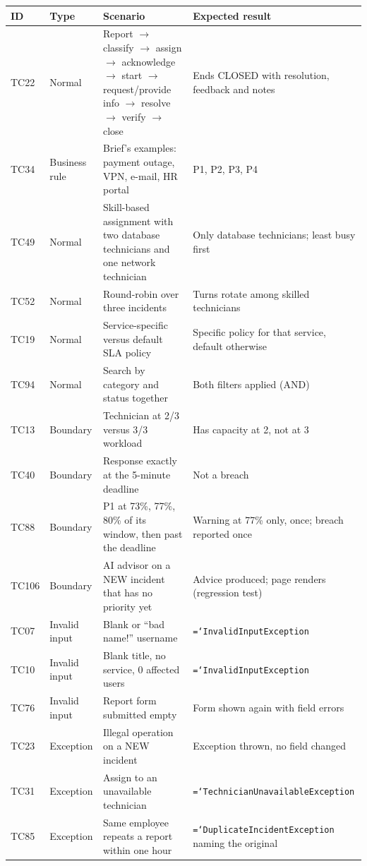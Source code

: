 \documentclass[11pt,a4paper]{article}
\newcommand{\code}[1]{\texttt{\hyphenchar\font=`\-\relax #1}}
\begin{document}
\begin{longtable}{@{}L{1.1cm}L{2.2cm}L{5.8cm}L{5.8cm}@{}}
\toprule
\textbf{ID} & \textbf{Type} & \textbf{Scenario} & \textbf{Expected result} \\
\midrule\endhead
TC22 & Normal & Report $\rightarrow$ classify $\rightarrow$ assign $\rightarrow$ acknowledge $\rightarrow$ start $\rightarrow$ request/provide info $\rightarrow$ resolve $\rightarrow$ verify $\rightarrow$ close & Ends CLOSED with resolution, feedback and notes \\
TC34 & Business rule & Brief's examples: payment outage, VPN, e-mail, HR portal & P1, P2, P3, P4 \\
TC49 & Normal & Skill-based assignment with two database technicians and one network technician & Only database technicians; least busy first \\
TC52 & Normal & Round-robin over three incidents & Turns rotate among skilled technicians \\
TC19 & Normal & Service-specific versus default SLA policy & Specific policy for that service, default otherwise \\
TC94 & Normal & Search by category and status together & Both filters applied (AND) \\
TC13 & Boundary & Technician at 2/3 versus 3/3 workload & Has capacity at 2, not at 3 \\
TC40 & Boundary & Response exactly at the 5-minute deadline & Not a breach \\
TC88 & Boundary & P1 at 73\%, 77\%, 80\% of its window, then past the deadline & Warning at 77\% only, once; breach reported once \\
TC106 & Boundary & AI advisor on a NEW incident that has no priority yet & Advice produced; page renders (regression test) \\
TC07 & Invalid input & Blank or ``bad name!'' username & \code{InvalidInputException} \\
TC10 & Invalid input & Blank title, no service, 0 affected users & \code{InvalidInputException} \\
TC76 & Invalid input & Report form submitted empty & Form shown again with field errors \\
TC23 & Exception & Illegal operation on a NEW incident & Exception thrown, no field changed \\
TC31 & Exception & Assign to an unavailable technician & \code{TechnicianUnavailableException} \\
TC85 & Exception & Same employee repeats a report within one hour & \code{DuplicateIncidentException} naming the original \\

\end{longtable}
\end{document}
